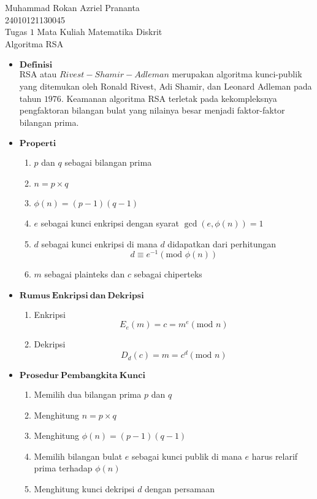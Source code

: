 \documentclass[12pt,A4paper]{article}
\begin{document}
	\begin{center}
		Muhammad Rokan Azriel Prananta
		\\ 24010121130045
		\\ Tugas $1$ Mata Kuliah Matematika Diskrit
		\\ Algoritma RSA
	\end{center}
	\begin{itemize}
		\item  $\mathbf{Definisi}$
		\\ RSA atau $Rivest-Shamir-Adleman$ merupakan algoritma kunci-publik yang ditemukan oleh Ronald Rivest, Adi Shamir, dan Leonard Adleman pada tahun $1976$. Keamanan algoritma RSA terletak pada kekompleksnya pengfaktoran bilangan bulat yang nilainya besar menjadi faktor-faktor bilangan prima.
		\item $\mathbf{Properti}$
		\begin{enumerate}
			\item $p$ dan $q$ sebagai bilangan prima
			\item $n = p \times q$
			\item  $\phi(n)= (p-1)(q-1)$
			\item $e$ sebagai kunci enkripsi dengan syarat $\gcd(e, \phi(n)) =1$
			\item $d$ sebagai kunci enkripsi di mana $d$ didapatkan dari perhitungan
			\[ d \equiv e^{-1} (\text{mod }\phi(n)) \]
			\item $m$ sebagai plainteks dan $c$ sebagai chiperteks
		\end{enumerate}
	\item $\mathbf{Rumus \: Enkripsi\:  dan \: Dekripsi}$
	\begin{enumerate}
		\item Enkripsi
		\[ E_e(m) = c = m^e (\text{mod } n)\]
		\item Dekripsi
		\[ D_d (c)= m = c^d (\text{mod } n) \]
	\end{enumerate}
	\item $\mathbf{Prosedur \: Pembangkita  \: Kunci}$
	\begin{enumerate}
		\item Memilih dua bilangan prima $p$ dan $q$
		\item Menghitung $n = p \times q$
		\item Menghitung $\phi(n)= (p-1)(q-1)$
		\item Memilih bilangan bulat $e$ sebagai kunci publik di mana $e$ harus relarif prima terhadap $\phi(n)$
		\item Menghitung kunci dekripsi $d$ dengan persamaan

\end{enumerate}
\end{itemize}
\end{document}
